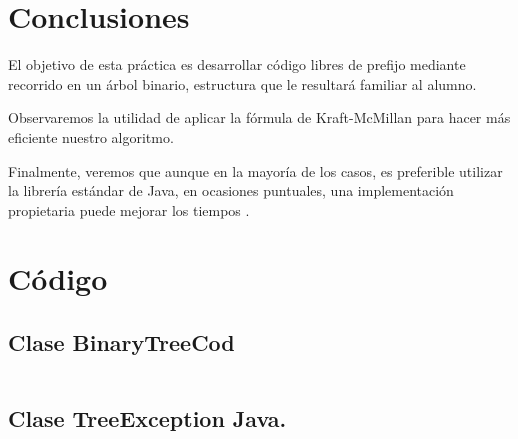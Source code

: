 \documentclass{article}
\begin{document}
\section{Conclusiones}

El objetivo de esta práctica es desarrollar código libres de prefijo mediante recorrido en un árbol binario, estructura que le resultará familiar al alumno.

Observaremos la utilidad de aplicar la fórmula de Kraft-McMillan para hacer más eficiente nuestro algoritmo.

Finalmente, veremos que aunque en la mayoría de los casos, es preferible utilizar la librería estándar de Java, en  ocasiones puntuales, una implementación propietaria puede mejorar los tiempos .



\section{Código}


\subsection*{Clase BinaryTreeCod } 

\inputminted[mathescape,
               numbersep=5pt,
               frame=lines,
               framesep=2mm]{java}{practica1/BinaryTreeCod.java}

 
\subsection*{Clase TreeException Java.} 
\inputminted[mathescape,
               numbersep=5pt,
               frame=lines,
               framesep=2mm]{java}{practica1/TreeException.java}
               
\end{document}
